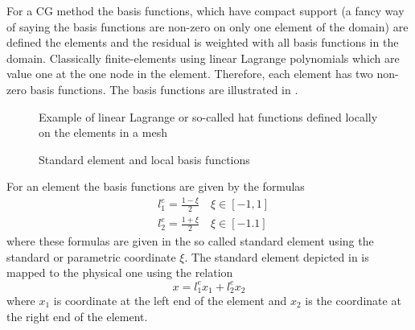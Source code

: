 For a CG method the basis functions, which have compact support (a fancy way of saying the basis functions are non-zero on only one element of the domain) are defined the elements and the residual is weighted with all basis functions in the domain.  Classically finite-elements using linear Lagrange polynomials which are value one at the one node in the element.  Therefore, each element has two non-zero basis functions.  The basis functions are illustrated in . 
\begin{figure}[h!]
\centering
{}
\caption{Example of linear Lagrange or so-called hat functions defined locally on the elements in a mesh}
\label{fig:c2_1d_lagrange}
\end{figure}



\begin{figure}[h!]
\centering
{}
\caption{Standard element and local basis functions}
\label{fig:c2_standard_elem}
\end{figure}

For an element the basis functions are given by the formulas
\begin{equation}
\begin{split}
& l^{e}_{1} = \frac{1 - \xi}{2} \quad \xi \in [-1,1] \\
& l^{e}_{2} = \frac{1+ \xi}{2} \quad \xi \in [-1.1]
\end{split}
\end{equation}
where these formulas are given in the so called standard element using the standard or parametric coordinate $\xi$.  The standard element depicted in  is mapped to the physical one using the relation
\begin{equation}
x = l^{e}_{1}x_{1} + l^{e}_{2}x_{2}
\end{equation}
 where $x_{1}$ is coordinate at the left end of the element and $x_{2}$ is the coordinate at the right end of the element. 
 
